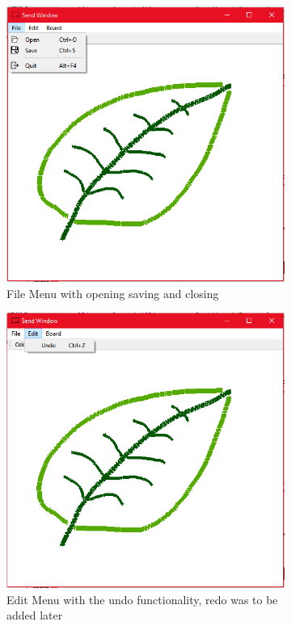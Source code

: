 \documentclass[10pt]{article}
\begin{document}
\begin{multicols*}{2}
\begin{figure}[H]
\begin{subfigure}[t]{0.32\columnwidth}
		\includegraphics[width=\columnwidth]{./file.png}
		\caption{File Menu with  opening saving and closing}
		\label{fig:file}
	\end{subfigure}
	\hfill
	\begin{subfigure}[t]{0.32\columnwidth}

		\includegraphics[width=\columnwidth]{./edit.png}
		\caption{Edit Menu with the undo functionality, redo was to be added later}
		\label{fig:edit}
	\end{subfigure}
	\hfill
	\begin{subfigure}[t]{0.32\columnwidth}


\end{subfigure}
\end{figure}
\end{multicols*}
\end{document}
